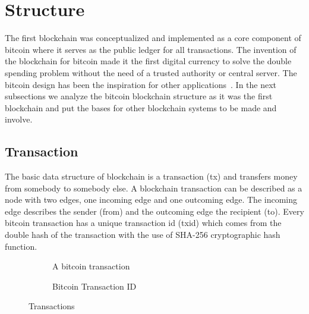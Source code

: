 \section{Structure}\label{blockchain:structure}

The first blockchain was conceptualized and implemented as a core component of bitcoin where it serves as the public ledger for all transactions.
The invention of the blockchain for bitcoin made it the first digital currency to solve the double spending problem without the need of a trusted authority or
central server. The bitcoin design has been the inspiration for other applications~\cite{7163021,10.1007/978-3-662-46803-6_10}. In the next subsections we analyze
the bitcoin blockchain structure as it was the first blockchain and put the bases for other blockchain systems to be made and involve.

\subsection{Transaction}\label{blockchain:structure:tx}

The basic data structure of blockchain is a transaction (tx) and transfers money from somebody to somebody else. A blockchain transaction can be described as
a node with two edges, one incoming edge and one outcoming edge. The incoming edge describes the sender (from) and the outcoming edge the recipient (to).
Every bitcoin transaction has a unique transaction id (txid) which comes from the double hash of the transaction with the use of SHA-256 cryptographic hash function.

\begin{figure}[h]
  \begin{subfigure}[t]{0.50\textwidth}
    \centering
    \caption{A bitcoin transaction}
    \label{fig:bl_tx:tx}
  \end{subfigure}
  \begin{subfigure}[t]{0.50\textwidth}
    \centering
    \caption{Bitcoin Transaction ID}
    \label{fig:bl_tx:id}
  \end{subfigure}
  \caption{Transactions}
  \label{fig:bl_transaction}
\end{figure}

